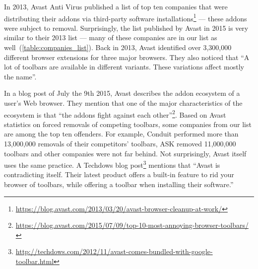 \documentclass[ijoc,nonblindrev]{informs3} %
\numberwithin{equation}{subsection}
\begin{document}
In 2013, Avast Anti Virus published a list of top ten companies that were distributing their addons via third-party software installations\footnote{\url{https://blog.avast.com/2013/03/20/avast-browser-cleanup-at-work/}} --- these addons were subject to removal. Surprisingly, the list published by Avast in 2015 is very similar to their 2013 list --- many of these companies are in our list as well~(\autoref{table:companies_list}). Back in 2013, Avast identified over 3,300,000 different browser extensions for three major browsers. They also noticed that ``A lot of toolbars are available in different variants. These variations affect mostly the name''. 

In a blog post of July the 9th 2015, Avast describes the addon ecosystem of a user's Web browser. They mention that one of the major characteristics of the ecosystem is that ``the addons fight against each other''\footnote{\url{https://blog.avast.com/2015/07/09/top-10-most-annoying-browser-toolbars/}}.
Based on Avast statistics on forced removals of competing toolbars, some companies from our list are among the top ten offenders. For example, Conduit performed more than 13,000,000 removals of their competitors' toolbars, ASK removed 11,000,000 toolbars and other companies were not far behind. Not surprisingly, Avast itself uses the same practice. A Techdows blog post\footnote{\url{http://techdows.com/2012/11/avast-comes-bundled-with-google-toolbar.html}} mentions that ``Avast is contradicting itself. Their latest product offers a built-in feature to rid your browser of toolbars, while offering a toolbar when installing their software.''
\end{document}
